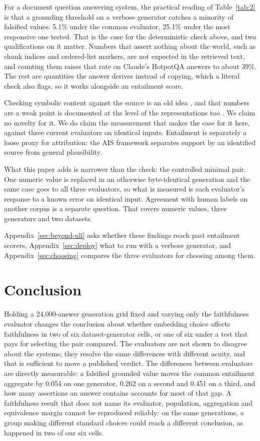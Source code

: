 \documentclass[11pt]{article}
\begin{document}
For a document question answering system, the practical reading of Table~\ref{tab:2} is that a grounding threshold on a verbose generator catches a minority of falsified values: 5.1\% under the common evaluator, 25.1\% under the most responsive one tested. That is the case for the deterministic check above, and two qualifications on it matter. Numbers that assert nothing about the world, such as chunk indices and ordered-list markers, are not expected in the retrieved text, and counting them raises that rate on Claude's HotpotQA answers to about 39\%. The rest are quantities the answer derives instead of copying, which a literal check also flags, so it works alongside an entailment score.

Checking symbolic content against the source is an old idea \citep{goodrich-etal-2019, nan-etal-2021, zhao-etal-2020}, and that numbers are a weak point is documented at the level of the representations too \citep{wallace-etal-2019}. We claim no novelty for it. We do claim the measurement that makes the case for it here, against three current evaluators on identical inputs. Entailment is separately a loose proxy for attribution: the AIS framework \citep{rashkin-etal-2023} separates support by an identified source from general plausibility.

What this paper adds is narrower than the check: the controlled minimal pair. One numeric value is replaced in an otherwise byte-identical generation and the same case goes to all three evaluators, so what is measured is each evaluator's response to a known error on identical input. Agreement with human labels on another corpus is a separate question. That covers numeric values, three generators and two datasets.

Appendix~\ref{sec:beyond-nli} asks whether these findings reach past entailment scorers, Appendix~\ref{sec:deploy} what to run with a verbose generator, and Appendix~\ref{sec:choosing} compares the three evaluators for choosing among them.


\section{Conclusion}
\label{sec:conclusion}

Holding a 24,000-answer generation grid fixed and varying only the faithfulness evaluator changes the conclusion about whether embedding choice affects faithfulness in two of six dataset-generator cells, or one of six under a test that pays for selecting the pair compared. The evaluators are not shown to disagree about the systems; they resolve the same differences with different acuity, and that is sufficient to move a published verdict. The differences between evaluators are directly measurable: a falsified grounded value moves the common entailment aggregate by 0.054 on one generator, 0.262 on a second and 0.451 on a third, and how many assertions an answer contains accounts for most of that gap. A faithfulness result that does not name its evaluator, population, aggregation and equivalence margin cannot be reproduced reliably: on the same generations, a group making different standard choices could reach a different conclusion, as happened in two of our six cells.
\end{document}

